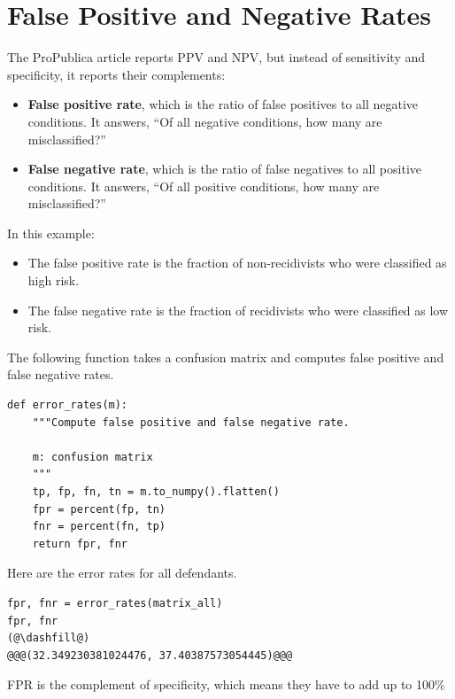 \hypertarget{false-positive-and-negative-rates}{%
\section{False Positive and Negative
Rates}\label{false-positive-and-negative-rates}}

The ProPublica article reports PPV and NPV, but instead of sensitivity
and specificity, it reports their complements:

\begin{itemize}
\item
  \textbf{False positive rate}, which is the ratio of false positives to
  all negative conditions. It answers, ``Of all negative conditions, how
  many are misclassified?''
\item
  \textbf{False negative rate}, which is the ratio of false negatives to
  all positive conditions. It answers, ``Of all positive conditions, how
  many are misclassified?''
\end{itemize}

In this example:

\begin{itemize}
\item
  The false positive rate is the fraction of non-recidivists who were
  classified as high risk.
\item
  The false negative rate is the fraction of recidivists who were
  classified as low risk.
\end{itemize}

The following function takes a confusion matrix and computes false
positive and false negative rates.

\begin{lstlisting}[]
def error_rates(m):
    """Compute false positive and false negative rate.
    
    m: confusion matrix
    """
    tp, fp, fn, tn = m.to_numpy().flatten()
    fpr = percent(fp, tn)
    fnr = percent(fn, tp)
    return fpr, fnr
\end{lstlisting}

Here are the error rates for all defendants.

\begin{lstlisting}[]
fpr, fnr = error_rates(matrix_all)
fpr, fnr
(@\dashfill@)
@@@(32.349230381024476, 37.40387573054445)@@@
\end{lstlisting}

FPR is the complement of specificity, which means they have to add up to
100\%

